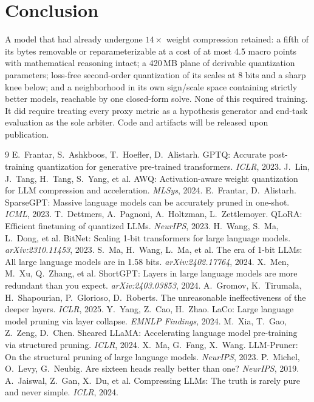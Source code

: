 \documentclass[10pt]{article}
\begin{document}
\section{Conclusion}
A model that had already undergone $14\times$ weight compression retained: a fifth of its bytes removable or reparameterizable at a cost of at most 4.5 macro points with mathematical reasoning intact; a 420\,MB plane of derivable quantization parameters; loss-free second-order quantization of its scales at 8 bits and a sharp knee below; and a neighborhood in its own sign/scale space containing strictly better models, reachable by one closed-form solve. None of this required training. It did require treating every proxy metric as a hypothesis generator and end-task evaluation as the sole arbiter. Code and artifacts will be released upon publication.

\begin{thebibliography}{9}\small
{} E.~Frantar, S.~Ashkboos, T.~Hoefler, D.~Alistarh. GPTQ: Accurate post-training quantization for generative pre-trained transformers. \emph{ICLR}, 2023.
 J.~Lin, J.~Tang, H.~Tang, S.~Yang, et al. AWQ: Activation-aware weight quantization for LLM compression and acceleration. \emph{MLSys}, 2024.
 E.~Frantar, D.~Alistarh. SparseGPT: Massive language models can be accurately pruned in one-shot. \emph{ICML}, 2023.
 T.~Dettmers, A.~Pagnoni, A.~Holtzman, L.~Zettlemoyer. QLoRA: Efficient finetuning of quantized LLMs. \emph{NeurIPS}, 2023.
 H.~Wang, S.~Ma, L.~Dong, et al. BitNet: Scaling 1-bit transformers for large language models. \emph{arXiv:2310.11453}, 2023.
 S.~Ma, H.~Wang, L.~Ma, et al. The era of 1-bit LLMs: All large language models are in 1.58 bits. \emph{arXiv:2402.17764}, 2024.
 X.~Men, M.~Xu, Q.~Zhang, et al. ShortGPT: Layers in large language models are more redundant than you expect. \emph{arXiv:2403.03853}, 2024.
 A.~Gromov, K.~Tirumala, H.~Shapourian, P.~Glorioso, D.~Roberts. The unreasonable ineffectiveness of the deeper layers. \emph{ICLR}, 2025.
 Y.~Yang, Z.~Cao, H.~Zhao. LaCo: Large language model pruning via layer collapse. \emph{EMNLP Findings}, 2024.
 M.~Xia, T.~Gao, Z.~Zeng, D.~Chen. Sheared LLaMA: Accelerating language model pre-training via structured pruning. \emph{ICLR}, 2024.
 X.~Ma, G.~Fang, X.~Wang. LLM-Pruner: On the structural pruning of large language models. \emph{NeurIPS}, 2023.
 P.~Michel, O.~Levy, G.~Neubig. Are sixteen heads really better than one? \emph{NeurIPS}, 2019.
 A.~Jaiswal, Z.~Gan, X.~Du, et al. Compressing LLMs: The truth is rarely pure and never simple. \emph{ICLR}, 2024.
\end{thebibliography}
\end{document}
